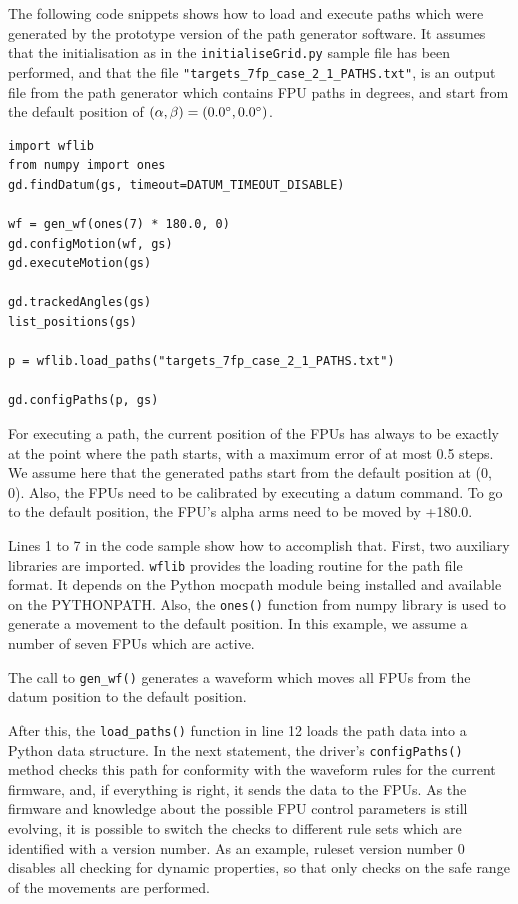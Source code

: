 \documentclass[11pt,a4paper]{report}
\begin{document}
The following code snippets shows how to load and execute paths which
were generated by the prototype version of the path generator
software. It assumes that the initialisation as in the
\texttt{initialiseGrid.py} sample file has been performed, and that
the file \texttt{"targets\_7fp\_case\_2\_1\_PATHS.txt"}, is an output file
from the path generator which contains FPU paths in degrees, and start
from the default position of $(\alpha,\beta) = (0.0\degree, 0.0\degree)$.

\begin{verbatim}
import wflib
from numpy import ones
gd.findDatum(gs, timeout=DATUM_TIMEOUT_DISABLE)

wf = gen_wf(ones(7) * 180.0, 0)
gd.configMotion(wf, gs)
gd.executeMotion(gs)

gd.trackedAngles(gs)
list_positions(gs)

p = wflib.load_paths("targets_7fp_case_2_1_PATHS.txt")

gd.configPaths(p, gs)
\end{verbatim}

For executing a path, the current position of the FPUs has always to
be exactly at the point where the path starts, with a maximum error of
at most 0.5 steps. We assume here that the generated paths start from
the default position at (0\degree, 0\degree). Also, the FPUs need to
be calibrated by executing a datum command. To go to the default position,
the FPU's alpha arms need to be moved by +180.0\degree.

Lines 1 to 7 in the code sample show how to accomplish that.  First,
two auxiliary libraries are imported. \texttt{wflib} provides the
loading routine for the path file format. It depends on the Python
mocpath module being installed and available on the PYTHONPATH.  Also,
the \texttt{ones()} function from numpy library is used to generate a
movement to the default position. In this example, we assume a number
of seven FPUs which are active.

The call to \texttt{gen\_wf()} generates a waveform which moves all
FPUs from the datum position to the default position.

After this, the \texttt{load\_paths()} function in line 12 loads the
path data into a Python data structure. In the next statement, the
driver's \texttt{configPaths()} method checks this path for conformity
with the waveform rules for the current firmware, and, if everything
is right, it sends the data to the FPUs. As the firmware and knowledge
about the possible FPU control parameters is still evolving, it is
possible to switch the checks to different rule sets which are
identified with a version number. As an example, ruleset version
number 0 disables all checking for dynamic properties, so that only
checks on the safe range of the movements are performed.
\end{document}
